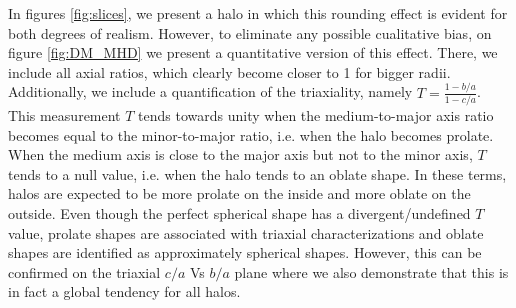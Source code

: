 In figures \ref{fig:slices}, we present a halo in which this rounding effect is evident for both degrees of realism. However, to eliminate any possible cualitative bias, on figure \ref{fig:DM_MHD} we present a quantitative version of this effect. There, we include all axial ratios, which clearly become closer to 1 for bigger radii. Additionally, we include a quantification of the triaxiality, namely $T=\frac{1-b/a}{1-c/a}$.\\

 This measurement $T$ tends towards unity when the medium-to-major axis ratio becomes equal to the minor-to-major ratio, i.e. when the halo becomes prolate. When the medium axis is close to the major axis but not to the minor axis, $T$ tends to a null value, i.e. when the halo tends to an oblate shape. In these terms, halos are expected to be more prolate on the inside and more oblate on the outside. Even though the perfect spherical shape has a divergent/undefined $T$ value, prolate shapes are associated with triaxial characterizations and oblate shapes are identified as approximately spherical shapes. However, this can be confirmed on the triaxial $c/a$ Vs $b/a$ plane where we also demonstrate that this is in fact a global tendency for all halos.\\


